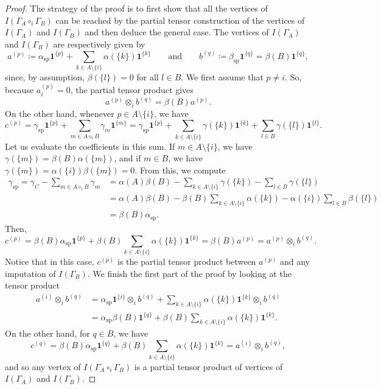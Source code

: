 \documentclass[10pt,a4paper]{amsart}
\begin{document}
\begin{proof}
The strategy of the proof is to first show that all the vertices of $I(\Gamma_A \circ_i \Gamma_B)$ can be reached by the partial tensor construction of the vertices of \(I(\Gamma_A)\) and \(I(\Gamma_B)\) and then deduce the general case. The vertices of \(I(\Gamma_A)\) and \(I(\Gamma_B)\) are respectively given by
    \[
    a^{(p)} \coloneqq \alpha_{\text{sp}} \mathbf{1}^{\{p\}} + \sum_{k \in A \setminus \{i\}} \alpha(\{k\}) \mathbf{1}^{\{k\}} \qquad \text{and} \qquad b^{(q)} \coloneqq \beta_{\text{sp}} \mathbf{1}^{\{q\}} = \beta(B) \mathbf{1}^{\{q\}},
    \]
since, by assumption,  \(\beta(\{l\}) = 0\) for all \(l \in B\). We first assume that \(p \neq i\). So, because \(a^{(p)}_i = 0\), the partial tensor product gives
    \[
    a^{(p)} \otimes_i b^{(q)} = \beta(B) a^{(p)}. 
    \]
    On the other hand, whenever \(p \in A \setminus \{i\}\), we have 
    \[
    c^{(p)} = \gamma_{\text{sp}} \mathbf{1}^{\{p\}} + \sum_{m \in A \diamond_i B} \gamma_m \mathbf{1}^{\{m\}} = \gamma_{\text{sp}} \mathbf{1}^{\{p\}} + \sum_{k \in A \setminus \{i\}} \gamma(\{k\}) \mathbf{1}^{\{k\}} + \sum_{l \in B} \gamma(\{l\}) \mathbf{1}^{\{l\}}. 
    \]
    Let us evaluate the coefficients in this sum. If \(m \in A \setminus \{i\}\), we have \(\gamma(\{m\}) = \beta(B) \alpha(\{m\})\), and if \(m \in B\), we have \(\gamma(\{m\}) = \alpha(\{i\}) \beta(\{m\}) = 0\). From this, we compute 
    \[ \begin{aligned}
    \gamma_{\text{sp}} = \gamma_C - \sum_{m \in A \diamond_i B} \gamma_m & = \alpha(A) \beta(B) - \sum_{k \in A\setminus \{i\}} \gamma(\{k\}) - \sum_{l \in B} \gamma(\{l\}) \\
    & = \alpha(A) \beta(B) - \beta(B) \sum_{k \in A \setminus \{i\}} \alpha(\{k\}) - \alpha(\{i\}) \sum_{l \in B} \beta(\{l\}) \\
    & = \beta(B) \alpha_{\text{sp}}. 
    \end{aligned} \]
    Then, 
    \[
    c^{(p)} = \beta(B) \alpha_{\text{sp}} \mathbf{1}^{\{p\}} + \beta(B) \sum_{k \in A \setminus \{i\}} \alpha(\{k\}) \mathbf{1}^{\{k\}} = \beta(B) a^{(p)} = a^{(p)} \otimes_i b^{(q)}. 
    \]
    Notice that in this case, \(c^{(p)}\) is the partial tensor product between \(a^{(p)}\) and any imputation of \(I(\Gamma_B)\). We finish the first part of the proof by looking at the tensor product
    \[ \begin{aligned} 
    a^{(i)} \otimes_i b^{(q)} & = \alpha_{\text{sp}} \mathbf{1}^{\{i\}} \otimes_i b^{(q)} + \sum_{k \in A \setminus \{i\}} \alpha(\{k\}) \mathbf{1}^{\{k\}} \otimes_i b^{(q)} \\
    & = \alpha_{\text{sp}} \beta(B) \mathbf{1}^{\{q\}} + \beta(B) \sum_{k \in A \setminus \{i\}} \alpha(\{k\})
    \mathbf{1}^{\{k\}}. 
    \end{aligned} \]
    On the other hand, for \(q \in B\), we have 
    \[
    c^{(q)} = \beta(B) \alpha_{\text{sp}} \mathbf{1}^{\{q\}} + \beta(B) \sum_{k \in A \setminus \{i\}} \alpha(\{k\}) \mathbf{1}^{\{k\}} = a^{(i)} \otimes_i b^{(q)}, 
    \]
    and so any vertex of \(I(\Gamma_A \circ_i \Gamma_B)\) is a partial tensor product of vertices of \(I(\Gamma_A)\) and \(I(\Gamma_B)\). 


\end{proof}
\end{document}
